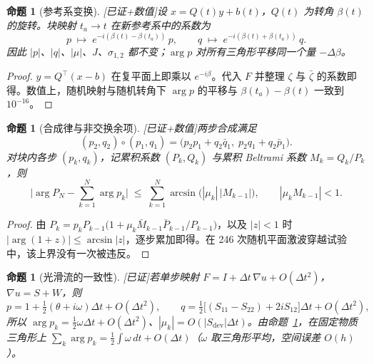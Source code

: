 \documentclass[10.5pt,a4paper]{article}
\theoremstyle{definition}
\theoremstyle{plain}
\newtheorem{proposition}[definition]{命题}
\theoremstyle{remark}
\newcommand{\status}[1]{\hfill{\small\color{accent}\textsf{[#1]}}}
\begin{document}
\begin{proposition}[参考系变换]\status{已证+数值}\label{prop:frame}
设 $x=Q(t)y+b(t)$，$Q(t)$ 为转角 $\beta(t)$ 的旋转。块映射 $t_a\to t$ 在新参考系中的系数为
\begin{equation}
p\;\mapsto\;e^{-i(\beta(t)-\beta(t_a))}\,p,\qquad q\;\mapsto\;e^{-i(\beta(t)+\beta(t_a))}\,q .
\end{equation}
因此 $|p|$、$|q|$、$|\mu|$、$J$、$\sigma_{1,2}$ 都不变；$\arg p$ 对所有三角形平移同一个量 $-\Delta\beta$。
\end{proposition}
\begin{proof}
$y=Q^\top(x-b)$ 在复平面上即乘以 $e^{-i\beta}$。代入 $F$ 并整理 $\zeta$ 与 $\bar\zeta$ 的系数即得。数值上，随机映射与随机转角下 $\arg p$ 的平移与 $\beta(t_a)-\beta(t)$ 一致到 $10^{-16}$。
\end{proof}

\begin{proposition}[合成律与非交换余项]\status{已证+数值}\label{prop:comp}
两步合成满足
\begin{equation}
(p_2,q_2)\circ(p_1,q_1)=\big(p_2p_1+q_2\bar q_1,\;p_2q_1+q_2\bar p_1\big).
\end{equation}
对块内各步 $(p_k,q_k)$，记累积系数 $(P_k,Q_k)$ 与累积 Beltrami 系数 $M_k=Q_k/P_k$，则
\begin{equation}
\Big|\arg P_N-\sum_{k=1}^N\arg p_k\Big|\;\le\;\sum_{k=1}^{N}\arcsin\!\big(|\mu_k|\,|M_{k-1}|\big),\qquad |\mu_kM_{k-1}|<1 .
\end{equation}
\end{proposition}
\begin{proof}
由 $P_k=p_kP_{k-1}\big(1+\mu_k\bar M_{k-1}\bar P_{k-1}/P_{k-1}\big)$，以及 $|z|<1$ 时 $|\arg(1+z)|\le\arcsin|z|$，逐步累加即得。在 246 次随机平面激波穿越试验中，该上界没有一次被违反。
\end{proof}

\begin{proposition}[光滑流的一致性]\status{已证}\label{prop:smooth}
若单步映射 $F=I+\Delta t\,\nabla u+O(\Delta t^2)$，$\nabla u=S+W$，则
\begin{equation}
p=1+\tfrac12(\theta+i\omega)\Delta t+O(\Delta t^2),\qquad q=\tfrac12\big[(S_{11}-S_{22})+2iS_{12}\big]\Delta t+O(\Delta t^2),
\end{equation}
所以 $\arg p_k=\tfrac12\omega\Delta t+O(\Delta t^2)$、$|\mu_k|=O(|S_{\mathrm{dev}}|\Delta t)$。由命题~\ref{prop:comp}，在固定物质三角形上 $\sum_k\arg p_k=\tfrac12\int\omega\,dt+O(\Delta t)$（$\omega$ 取三角形平均，空间误差 $O(h)$）。
\end{proposition}
\end{document}
